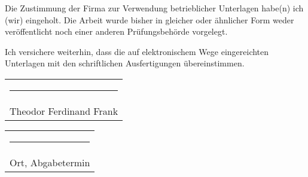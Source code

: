 \documentclass[12pt,a4paper]{article}
\begin{document}
Die Zustimmung der Firma zur Verwendung betrieblicher Unterlagen habe(n) ich (wir) eingeholt. Die Arbeit wurde bisher in gleicher oder ähnlicher Form weder veröffentlicht noch einer anderen Prüfungsbehörde vorgelegt.
\medskip

Ich versichere weiterhin, dass die auf elektronischem Wege eingereichten Unterlagen mit den schriftlichen Ausfertigungen übereinstimmen.

\vspace{15mm}
\hfill%
\begin{tabular}[t]{c}
  \rule{10em}{0.4pt}\\ Theodor Ferdinand Frank
\end{tabular}%
\hfill%
\begin{tabular}[t]{c}
  \rule{10em}{0.4pt}\\ Ort, Abgabetermin
\end{tabular}%
\hfill\strut
\end{document}
